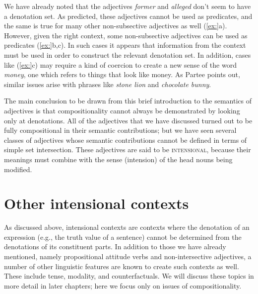 We have already noted that the adjectives \textit{former} and \textit{alleged} don’t seem to have a denotation set. As predicted, these adjectives cannot be used as predicates, and the same is true for many other non-subsective adjectives as well (\ref{ex:}a). However, given the right context, some non-subsective adjectives can be used as predicates (\ref{ex:}b,c). In such cases it appears that information from the context must be used in order to construct the relevant denotation set. In addition, cases like (\ref{ex:}c) may require a kind of coercion to create a new sense of the word \textit{money}, one which refers to things that look like money. As Partee points out, similar issues arise with phrases like \textit{stone lion} and \textit{chocolate bunny}.


\ea
{}
                       \z
\z


The main conclusion to be drawn from this brief introduction to the semantics of adjectives is that compositionality cannot always be demonstrated by looking only at denotations. All of the adjectives that we have discussed turned out to be fully compositional in their semantic contributions; but we have seen several classes of adjectives whose semantic contributions cannot be defined in terms of simple set intersection. These adjectives are said to be \textsc{intensional}, because their meanings must combine with the sense (intension) of the head nouns being modified.


\section{Other intensional contexts}\label{sec:15.4}

As discussed above, intensional contexts are contexts where the denotation of an expression (e.g., the truth value of a sentence) cannot be determined from the denotations of its constituent parts. In addition to those we have already mentioned, namely propositional attitude verbs and non-intersective adjectives, a number of other linguistic features are known to create such contexts as well. These include tense, modality, and counterfactuals. We will discuss these topics in more detail in later chapters; here we focus only on issues of compositionality.



